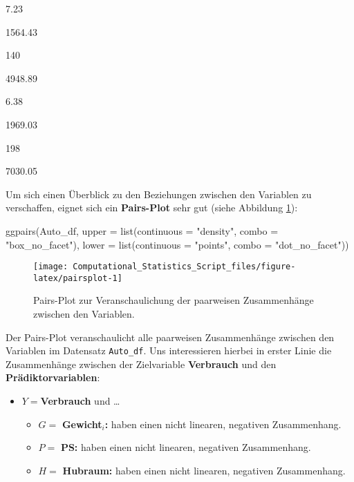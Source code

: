 \documentclass[
  ngerman,
]{book}
\newenvironment{Shaded}{\begin{snugshade}}{\end{snugshade}}
\newcommand{\AttributeTok}[1]{\textcolor[rgb]{0.77,0.63,0.00}{#1}}
\newcommand{\FunctionTok}[1]{\textcolor[rgb]{0.00,0.00,0.00}{#1}}
\newcommand{\NormalTok}[1]{#1}
\newcommand{\StringTok}[1]{\textcolor[rgb]{0.31,0.60,0.02}{#1}}
\providecommand{\tightlist}{%
  \setlength{\itemsep}{0pt}\setlength{\parskip}{0pt}}
\begin{document}
7.23

1564.43

140

4948.89

6.38

1969.03

198

7030.05

Um sich einen Überblick zu den Beziehungen zwischen den Variablen zu verschaffen, eignet sich ein \textbf{Pairs-Plot} sehr gut (siehe Abbildung \ref{fig:pairsplot}):

\begin{Shaded}
\begin{Highlighting}[]
\FunctionTok{ggpairs}\NormalTok{(Auto\_df,}
\AttributeTok{upper =} \FunctionTok{list}\NormalTok{(}\AttributeTok{continuous =} \StringTok{"density"}\NormalTok{, }\AttributeTok{combo =} \StringTok{"box\_no\_facet"}\NormalTok{),}
\AttributeTok{lower =} \FunctionTok{list}\NormalTok{(}\AttributeTok{continuous =} \StringTok{"points"}\NormalTok{, }\AttributeTok{combo =} \StringTok{"dot\_no\_facet"}\NormalTok{))}
\end{Highlighting}
\end{Shaded}

\begin{figure}[h]

{\centering \texttt{[image: Computational\_Statistics\_Script\_files/figure-latex/pairsplot-1]} 

}

\caption{Pairs-Plot zur Veranschaulichung der paarweisen Zusammenhänge zwischen den Variablen.}\label{fig:pairsplot}
\end{figure}

Der Pairs-Plot veranschaulicht alle paarweisen Zusammenhänge zwischen den Variablen im Datensatz \texttt{Auto\_df}. Uns interessieren hierbei in erster Linie die Zusammenhänge zwischen der Zielvariable \textbf{Verbrauch} und den \textbf{Prädiktorvariablen}:

\begin{itemize}
\tightlist
\item
  \(Y=\)\textbf{Verbrauch} und \ldots{}

  \begin{itemize}
  \tightlist
  \item
    \(G=\) \textbf{Gewicht}\(_i\)\textbf{:} haben einen nicht linearen, negativen Zusammenhang.
  \item
    \(P=\) \textbf{PS:} haben einen nicht linearen, negativen Zusammenhang.
  \item
    \(H=\) \textbf{Hubraum:} haben einen nicht linearen, negativen Zusammenhang.
  \end{itemize}
\end{itemize}
\end{document}
